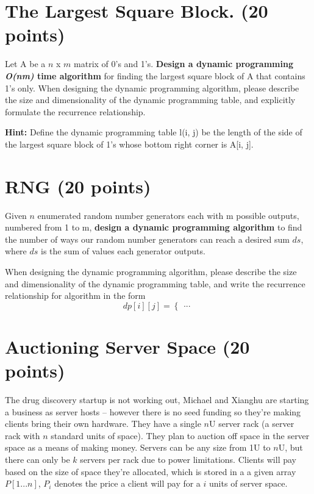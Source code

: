 \documentclass{article}[12pt]
\begin{document}
\section{The Largest Square Block. (20 points)}
Let A be a $n$ x $m$ matrix of 0's and 1's. \textbf{Design a dynamic programming \textit{O(nm)} time algorithm} for finding the largest square block of A that contains 1's only. When designing the dynamic programming algorithm, please describe the size and dimensionality of the dynamic programming table, and explicitly formulate the recurrence relationship. 

\noindent\textbf{Hint:} Define the dynamic programming table l(i, j) be the length of the side of the largest square block of 1's whose bottom right corner is A[i, j].


\section{RNG (20 points) }

Given $n$ enumerated random number generators each with m possible outputs, numbered from 1 to m, \textbf{design a dynamic programming algorithm} to find the number of ways our random number generators can reach a desired sum $ds$, where $ds$ is the sum of values each generator outputs.

When designing the dynamic programming algorithm, please describe the size and dimensionality of the dynamic programming table, and write the recurrence relationship for algorithm in the form
    \[
    dp[i][j] = \begin{cases}
        ...
    \end{cases}
    \]

\newpage
\section{Auctioning Server Space (20 points)}

The drug discovery startup is not working out, Michael and Xianghu are starting a business as server hosts -- however there is no seed funding so they're making clients bring their own hardware. They have a single $n$U server rack (a server rack with $n$ standard units of space). They plan to auction off space in the server space as a means of making money. Servers can be any size from 1U to $n$U, but there can only be $k$ servers per rack due to power limitations. Clients will pay based on the size of space they're allocated, which is stored in a a given array $P[1...n]$, $P_i$ denotes the price a client will pay for a $i$ units of server space.
\end{document}
